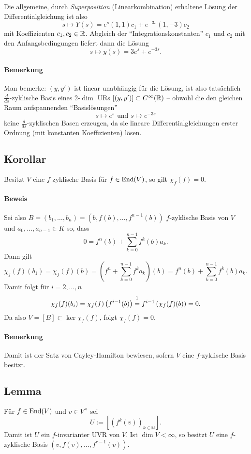 	Die allgemeine, durch \emph{Superposition} (Linearkombination) erhaltene Lösung der Differentialgleichung ist also
		\[ s\mapsto Y(s) = e^s(1,1)c_1 + e^{-3s}(1,-3)c_2 \]
	mit Koeffizienten $ c_1,c_2 \in \mathbb{R} $. Abgleich der "`Integrationskonstanten"' $ c_1 $ und $ c_2 $ mit den Anfangsbedingungen liefert dann die Lösung
		\[ s \mapsto y(s) = 3e^s+e^{-3s}. \]
\paragraph{Bemerkung}
	Man bemerke: $ (y,y') $ ist linear unabhängig für die Lösung, ist also tatsächlich $ \frac{d}{ds} $-zyklische Basis eines 2-$ \dim $ URs $ [(y,y')]\subset C^\infty(\mathbb{R}) $ -- obwohl die den gleichen Raum aufspannenden "`Basislösungen"'
		\[ s\mapsto e^s \text{ und } s\mapsto e^{-3s} \]
	keine $ \frac{d}{ds} $-zyklischen Basen erzeugen, da sie lineare Differentialgleichungen erster Ordnung (mit konstanten Koeffizienten) lösen.
	
\subsection{Korollar}
\begin{Korollar}
	Besitzt $ V $ eine $ f $-zyklische Basis für $ f\in\operatorname{End}(V) $, so gilt $ \chi_f(f)=0 $.
\end{Korollar}
\paragraph{Beweis}
	Sei also $ B=(b_1,\dots,b_n) =(b,f(b),\dots,f^{n-1}(b)) $ $ f $-zyklische Basis von $ V $ und $ a_0,\dots,a_{n-1}\in K $ so, dass
		\[ 0 = f^n(b)+\sum_{k=0}^{n-1}f^k(b)a_k. \]
	Dann gilt
		\[ \chi_f(f)(b_1) = \chi_f(f)(b) = \left(f^n+\sum_{k=0}^{n-1}f^ka_k\right)(b) = f^n(b)+\sum_{k=0}^{n-1}f^k(b)a_k. \]
	Damit folgt für $ i=2,\dots,n $
		\[ \chi_f(f)(b_i) = \chi_f(f)\left(f^{i-1}(b)\right) \stackrel{\footnotemark}{=} f^{i-1}\left(\chi_f(f)(b) \right) = 0. \]
	Da also $ V=[B] \subset \ker {\chi_f(f)}$, folgt $ \chi_f(f) = 0. $
\paragraph{Bemerkung}
	Damit ist der Satz von Cayley-Hamilton bewiesen, sofern $ V $ eine $ f $-zyklische Basis besitzt.
	
\subsection{Lemma}
\begin{Lemma}
	Für $ f\in\operatorname{End}(V) $ und $ v\in V^\times  $ sei
		\[ U := \left[\left(f^k(v)\right)_{k\in{\mathbb{N}}}\right]. \]
	Damit ist $ U $ ein $ f $-invarianter UVR von $ V $. Ist $ \dim V < \infty $, so besitzt $ U $ eine $ f $-zyklische Basis $ \left(v,f(v),\dots,f^{r-1}(v)\right) $.
\end{Lemma}
